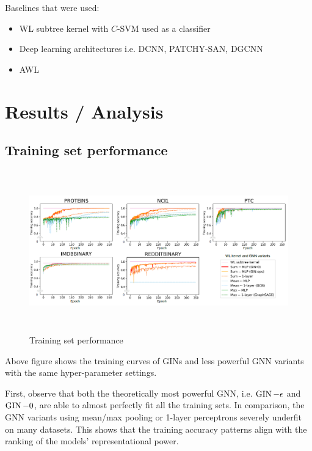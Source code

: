 Baselines that were used:

\begin{itemize}
	\item WL subtree kernel with $C$-SVM used as a classifier
	\item Deep learning architectures i.e. DCNN, PATCHY-SAN, DGCNN
	\item AWL
\end{itemize}

\section{Results / Analysis}

\subsection{Training set performance}

\begin{figure}[!hbt]
\centering
  \includegraphics[height=7cm]{experiments/fig/fig5.png}
  \caption{Training set performance}
\end{figure}

Above figure shows the training curves of GINs and less powerful GNN variants with the same hyper-parameter settings.

First, observe that both the theoretically most powerful GNN, i.e. $\operatorname{GIN}-\epsilon$ and $\operatorname{GIN}-0$, are able to almost perfectly fit all the training sets.
In comparison, the GNN variants using mean/max pooling or 1-layer perceptrons severely underfit on many datasets.
This shows that the training accuracy patterns align with the ranking of the models’ representational power.

